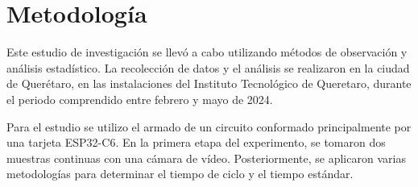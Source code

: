     \section{Metodología} %
    
    Este estudio de investigación se llevó a cabo utilizando métodos de observación y análisis estadístico. La recolección de datos y el análisis se realizaron en la ciudad de Querétaro, en las instalaciones del Instituto Tecnológico de Queretaro, durante el periodo comprendido entre febrero y mayo de 2024.
    
    Para el estudio se utilizo el armado de un circuito  conformado principalmente por una tarjeta ESP32-C6.
    En la primera etapa del experimento, se tomaron dos muestras continuas con una cámara de vídeo. Posteriormente, se aplicaron varias metodologías para determinar el tiempo de ciclo y el tiempo estándar.
    
